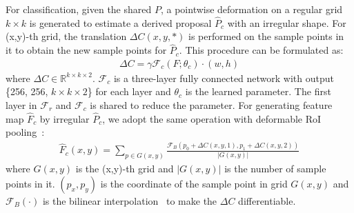\documentclass[10pt,twocolumn,letterpaper]{article}
\begin{document}
For classification, given the shared $P$,
a pointwise deformation on a regular grid $k\times k$ is generated to estimate a derived proposal $\hat{P}_c$ with an irregular shape.
For (x,y)-th grid, the translation $\Delta C(x,y,*)$ is performed on the sample points in it to obtain the new sample points for $\hat{P}_c$.
This procedure can be formulated as:
\begin{equation}
\begin{split}
\Delta C = \gamma \mathcal{F}_c (F;\theta_c) \cdot (w, h)
\end{split}
\end{equation}
where $\Delta C\in \mathbb{R}^{k\times k \times 2}$. $\mathcal{F}_c$ is a three-layer fully connected network with output \{256, 256, $k\times k\times 2$\} for each layer and $\theta_c$ is the learned parameter. The first layer in $\mathcal{F}_r$ and $\mathcal{F}_c$ is shared to reduce the parameter.
For generating feature map $\hat{F}_c$ by irregular $\hat{P}_c$, we adopt the same operation with deformable RoI pooling~\cite{dai2017deformable}:
\begin{equation}
\begin{split}
\hat{F}_c(x,y) \!=\! \sum_{p\in G(x,y) }\! \frac{\mathcal{F}_{B}(p_0+\Delta C(x,y,1), p_1+\Delta C(x,y,2))}{|G(x,y)|}
\end{split}
\end{equation}
where $G(x,y)$ is the (x,y)-th grid and $|G(x,y)|$ is the number of sample points in it.
$(p_x, p_y)$ is the coordinate of the sample point in grid $G(x,y)$ and $\mathcal{F}_{B}(\cdot)$ is the bilinear interpolation~\cite{dai2017deformable} to make the $\Delta C$ differentiable.
\end{document}
